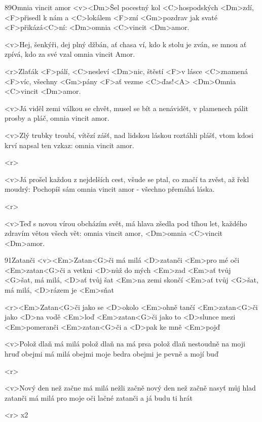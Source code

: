 \begin{song}[Klíč]{89}{Omnia vincit amor}{}
	<v><Dm>Šel pocestný kol <C>hospodských <Dm>zdí,
	<F>přisedl k nám a <C>lokálem <F>zní
	<Gm>pozdrav jak svaté <F>přikázá<C>ní:
	<Dm>omnia <C>vincit <Dm>amor.

	<v>Hej, šenkýři, dej plný džbán,
	ať chasa ví, kdo k stolu je zván,
	se mnou ať zpívá, kdo za své vzal
	omnia vincit Amor.

	<r>Zlaťák <F>pálí, <C>nesleví <Dm>nic,
	štěstí <F>v lásce <C>znamená <F>víc,
	všechny <Gm>pány <F>ať vezme <C>ďas!<A>
	<Dm>Omnia <C>vincit <Dm>amor.

	<v>Já viděl zemi válkou se chvět,
	musel se bít a nenávidět,
	v plamenech pálit prosby a pláč,
	omnia vincit amor.

	<v>Zlý trubky troubí, vítězí zášť,
	nad lidskou láskou roztáhli plášť,
	vtom kdosi krví napsal ten vzkaz:
	omnia vincit amor.

	<r>

	<v>Já prošel každou z nejdelších cest,
	všude se ptal, co značí ta zvěst,
	až řekl moudrý: Pochopíš sám
	omnia vincit amor - všechno přemáhá láska.

	<r>

	<v>Teď s novou vírou obcházím svět,
	má hlava zšedla pod tíhou let,
	každého zdravím větou všech vět:
	omnia vincit amor,
	<Dm>omnia <C>vincit <Dm>amor.
\end{song}
\begin{song}{91}{Zatanči}{}
	<v><Em>Zatan<G>či má milá <D>zatanči <Em>pro mé oči
	<Em>zatan<G>či a vetkni <D>nůž do mých <Em>zad
	<Em>ať tvůj <G>šat, má milá, <D>ať tvůj šat <Em>na zemi skončí
	<Em>ať tvůj <G>šat, má milá, <D>rázem je <Em>sňat

	<r><Em>Zatan<G>či jako se <D>okolo <Em>ohně tančí
	<Em>zatan<G>či jako <D>na vodě <Em>loď
	<Em>zatan<G>či jako to <D>slunce mezi <Em>pomeranči
	<Em>zatan<G>či a <D>pak ke mně <Em>pojď

	<v>Polož dlaň má milá polož dlaň na má prsa
	polož dlaň nestoudně na moji hruď
	obejmi má milá obejmi moje bedra
	obejmi je pevně a mojí buď

	<r>

	<v>Nový den než začne má milá nežli začně
	nový den než začně nasyť můj hlad
	zatanči má milá pro moje oči lačné
	zatanči a já budu ti hrát

	<r>
	x2
\end{song}
